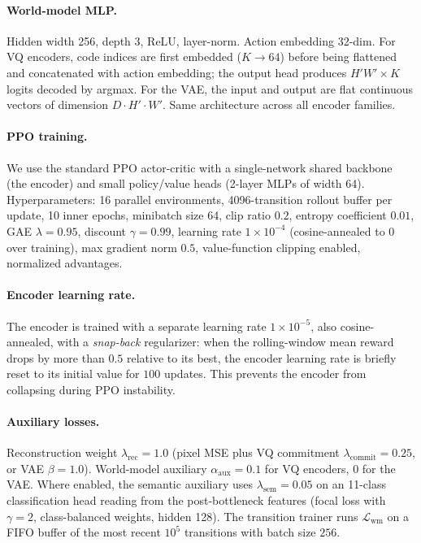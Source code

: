 \documentclass{article}
\begin{document}
\paragraph{World-model MLP.}
Hidden width 256, depth 3, ReLU, layer-norm. Action embedding 32-dim. For VQ encoders, code indices are first embedded ($K \to 64$) before being flattened and concatenated with action embedding; the output head produces $H'W' \times K$ logits decoded by argmax. For the VAE, the input and output are flat continuous vectors of dimension $D \cdot H' \cdot W'$. Same architecture across all encoder families.

\paragraph{PPO training.}
We use the standard PPO actor-critic with a single-network shared backbone (the encoder) and small policy/value heads (2-layer MLPs of width 64). Hyperparameters: 16 parallel environments, 4096-transition rollout buffer per update, 10 inner epochs, minibatch size 64, clip ratio $0.2$, entropy coefficient $0.01$, GAE $\lambda{=}0.95$, discount $\gamma{=}0.99$, learning rate $1{\times}10^{-4}$ (cosine-annealed to $0$ over training), max gradient norm $0.5$, value-function clipping enabled, normalized advantages.

\paragraph{Encoder learning rate.}
The encoder is trained with a separate learning rate $1{\times}10^{-5}$, also cosine-annealed, with a \emph{snap-back} regularizer: when the rolling-window mean reward drops by more than $0.5$ relative to its best, the encoder learning rate is briefly reset to its initial value for $100$ updates. This prevents the encoder from collapsing during PPO instability.

\paragraph{Auxiliary losses.}
Reconstruction weight $\lambda_{\text{rec}}{=}1.0$ (pixel MSE plus VQ commitment $\lambda_{\text{commit}}{=}0.25$, or VAE $\beta{=}1.0$). World-model auxiliary $\alpha_{\text{aux}}{=}0.1$ for VQ encoders, $0$ for the VAE. Where enabled, the semantic auxiliary uses $\lambda_{\text{sem}}{=}0.05$ on an 11-class classification head reading from the post-bottleneck features (focal loss with $\gamma{=}2$, class-balanced weights, hidden 128). The transition trainer runs $\mathcal{L}_{\text{wm}}$ on a FIFO buffer of the most recent $10^5$ transitions with batch size $256$.
\end{document}
